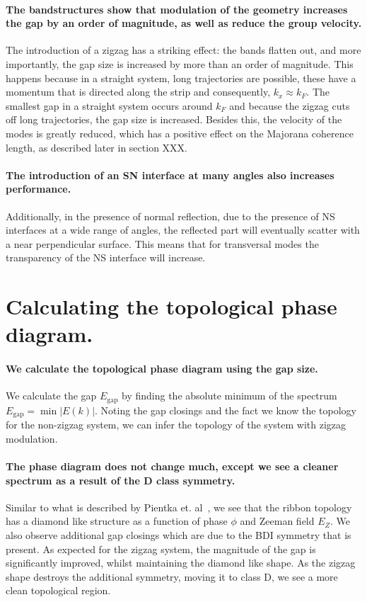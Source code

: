 \documentclass[english, twocolumn, 10pt, aps, superscriptaddress, floatfix, prb, citeautoscript]{revtex4-1}
\renewcommand{\comment}[2]{#2}
\renewcommand{\comment}{\paragraph}
\begin{document}
\comment{The bandstructures show that modulation of the geometry increases the gap by an order of magnitude, as well as reduce the group velocity.}
The introduction of a zigzag has a striking effect: the bands flatten out, and more importantly, the gap size is increased by more than an order of magnitude.
This happens because in a straight system, long trajectories are possible, these have a momentum that is directed along the strip and consequently, $k_x \approx k_F$.
The smallest gap in a straight system occurs around $k_F$ and because the zigzag cuts off long trajectories, the gap size is increased. 
Besides this, the velocity of the modes is greatly reduced, which has a positive effect on the Majorana coherence length, as described later in section XXX. %

\comment{The introduction of an SN interface at many angles also increases performance.}
Additionally, in the presence of normal reflection, due to the presence of NS interfaces at a wide range of angles, the reflected part will eventually scatter with a near perpendicular surface.
This means that for transversal modes the transparency of the NS interface will increase.


\section{Calculating the topological phase diagram.}

\comment{We calculate the topological phase diagram using the gap size.}
We calculate the gap $E_\textrm{gap}$ by finding the absolute minimum of the spectrum $E_\textrm{gap}=\min{|E(k)|}$.
Noting the gap closings and the fact we know the topology for the non-zigzag system, we can infer the topology of the system with zigzag modulation. %

\comment{The phase diagram does not change much, except we see a cleaner spectrum as a result of the D class symmetry. }
Similar to what is described by Pientka et. al~\cite{pientka2017topological}, we see that the ribbon topology has a diamond like structure as a function of phase $\phi$ and Zeeman field $E_Z$.
We also observe additional gap closings which are due to the BDI symmetry that is present.
As expected for the zigzag system, the magnitude of the gap is significantly improved, whilst maintaining the diamond like shape.
As the zigzag shape destroys the additional symmetry, moving it to class D, we see a more clean topological region.
\end{document}

